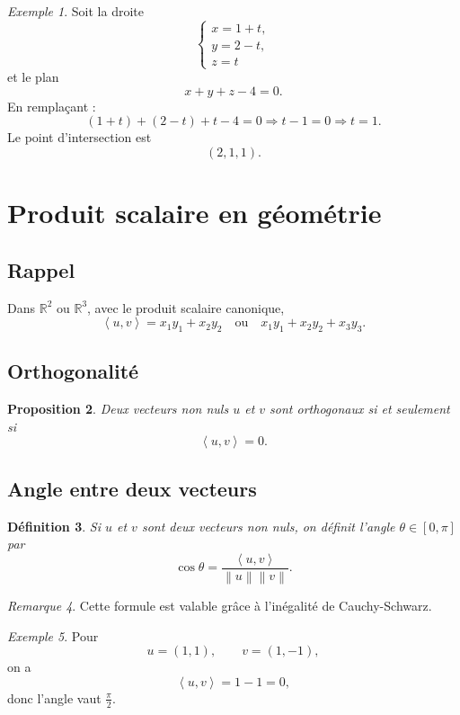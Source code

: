\documentclass[11pt,a4paper]{article}
\newtheorem{definition}{Définition}[section]
\newtheorem{proposition}[definition]{Proposition}
\theoremstyle{remark}
\newtheorem{remarque}[definition]{Remarque}
\newtheorem{exemple}[definition]{Exemple}
\newcommand{\R}{\mathbb{R}}
\newcommand{\scal}[2]{\left\langle #1,#2\right\rangle}
\newcommand{\Norm}[1]{\left\|#1\right\|}
\begin{document}
\begin{exemple}
Soit la droite
\[
\begin{cases}
x=1+t,\\
y=2-t,\\
z=t
\end{cases}
\]
et le plan
\[
x+y+z-4=0.
\]
En remplaçant :
\[
(1+t)+(2-t)+t-4=0
\Longrightarrow
t-1=0
\Longrightarrow
t=1.
\]
Le point d’intersection est
\[
(2,1,1).
\]
\end{exemple}

\section{Produit scalaire en géométrie}

\subsection{Rappel}

Dans \(\R^2\) ou \(\R^3\), avec le produit scalaire canonique,
\[
\scal{u}{v}=x_1y_1+x_2y_2
\quad \text{ou} \quad
x_1y_1+x_2y_2+x_3y_3.
\]

\subsection{Orthogonalité}

\begin{proposition}
Deux vecteurs non nuls \(u\) et \(v\) sont orthogonaux si et seulement si
\[
\scal{u}{v}=0.
\]
\end{proposition}

\subsection{Angle entre deux vecteurs}

\begin{definition}
Si \(u\) et \(v\) sont deux vecteurs non nuls, on définit l’angle \(\theta\in[0,\pi]\) par
\[
\cos\theta=\frac{\scal{u}{v}}{\Norm{u}\Norm{v}}.
\]
\end{definition}

\begin{remarque}
Cette formule est valable grâce à l’inégalité de Cauchy-Schwarz.
\end{remarque}

\begin{exemple}
Pour
\[
u=(1,1),\qquad v=(1,-1),
\]
on a
\[
\scal{u}{v}=1-1=0,
\]
donc l’angle vaut \(\frac{\pi}{2}\).
\end{exemple}
\end{document}
